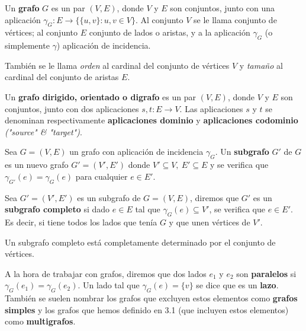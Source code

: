 \begin{ndef}[Grafo]
    Un \textbf{grafo} $G$ es un par $(V, E)$, donde $V$ y $E$ son conjuntos, junto con una aplicación $\gamma_G : E \rightarrow \{\{u,v\} : u,v \in V\}$.
    Al conjunto $V$ se le llama conjunto de vértices; al conjunto $E$ conjunto de lados o aristas, y a la aplicación $\gamma_G$ (o simplemente $\gamma$) aplicación de incidencia.
\end{ndef}
\begin{nota}
    También se le llama \textit{orden} al cardinal del conjunto de vértices $V$ y \textit{tamaño} al cardinal del conjunto de aristas  $E$.
\end{nota}

\begin{ndef}[Digrafo]
    Un \textbf{grafo dirigido, orientado o digrafo} es un par $(V,E)$, donde $V$ y $E$ son conjuntos, junto con dos aplicaciones $s,t : E \rightarrow V$. Las aplicaciones $s$ y $t$ se denominan respectivamente \textbf{aplicaciones dominio} y \textbf{aplicaciones codominio} \textit{("source" \& "target")}.
\end{ndef}

\begin{ndef}[Subgrafo]
    Sea $G = (V,E)$ un grafo con aplicación de incidencia $\gamma_G$. Un \textbf{subgrafo} $G'$ de $G$ es un nuevo grafo $G'=(V',E')$ donde $V' \subseteq V, \ E' \subseteq E$ y se verifica que $\gamma_{G'}(e) = \gamma_G(e)$ para cualquier $e \in E'$.
\end{ndef}

\begin{ndef}
    Sea $G' = (V', E')$ es un subgrafo de $G = (V, E)$, diremos que $G'$ es un \textbf{subgrafo completo} si dado $e \in E$ tal que $\gamma_G(e) \subseteq V'$, se verifica que $e \in E'$. Es decir, si tiene todos los lados que tenía $G$ y que unen vértices de $V'$.
\end{ndef}
\begin{obs}
    Un subgrafo completo está completamente determinado por el conjunto de vértices.
\end{obs}

A la hora de trabajar con grafos, diremos que dos lados $e_1$ y $e_2$ son \textbf{paralelos} si $\gamma_G(e_1) = \gamma_G(e_2)$. Un lado tal que $\gamma_G(e) = \{v\}$ se dice que es un \textbf{lazo}.
También se suelen nombrar los grafos que excluyen estos elementos como \textbf{grafos simples} y los grafos que hemos definido en 3.1 (que incluyen estos elementos) como \textbf{multigrafos}.


